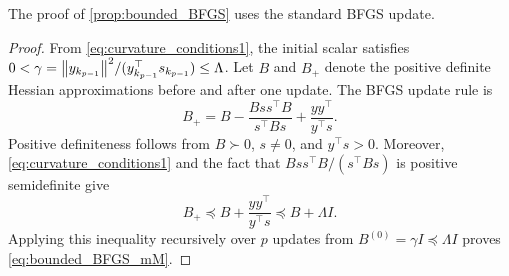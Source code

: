 The proof of \cref{prop:bounded_BFGS} uses the standard BFGS update.
\begin{proof}
    From \cref{eq:curvature_conditions1}, the initial scalar satisfies $0<\gamma=\norm{y_{k_{p-1}}}^2/(y_{k_{p-1}}^\top s_{k_{p-1}})\leq\Lambda$.
    Let $B$ and $B_+$ denote the positive definite Hessian approximations before and after one update.
    The BFGS update rule is
    \begin{equation*}
        B_+=B - \frac{Bss^\top B}{s^\top Bs} + \frac{yy^\top}{y^\top s}.
    \end{equation*}
    Positive definiteness follows from $B\succ0$, $s\neq0$, and $y^\top s>0$.
    Moreover, \cref{eq:curvature_conditions1} and the fact that $Bss^\top B/(s^\top Bs)$ is positive semidefinite give
    \begin{equation*}
        B_+\preceq B+\frac{yy^\top}{y^\top s}\preceq B+\Lambda I.
    \end{equation*}
    Applying this inequality recursively over $p$ updates from $B^{(0)}=\gamma I\preceq\Lambda I$ proves \cref{eq:bounded_BFGS_mM}.
    \myQED
\end{proof}
